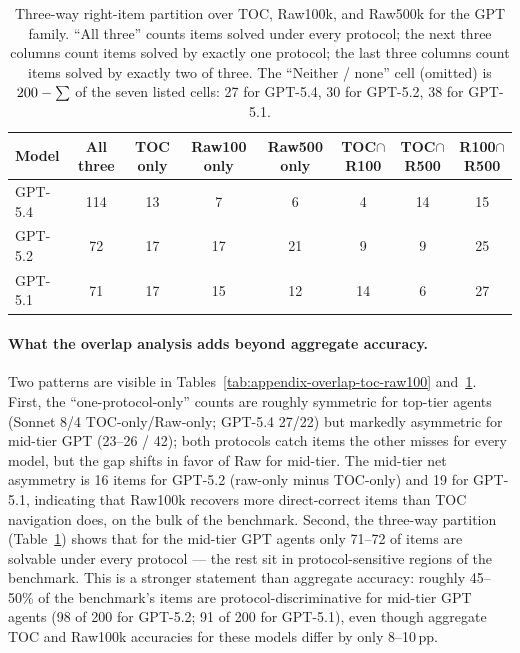 \documentclass{article}
\begin{document}
\begin{table}[h]
\centering
\small
\setlength{\tabcolsep}{6pt}
\caption{Three-way right-item partition over TOC, Raw100k, and Raw500k for the GPT family. ``All three'' counts items solved under every protocol; the next three columns count items solved by exactly one protocol; the last three columns count items solved by exactly two of three. The ``Neither / none'' cell (omitted) is $200-\sum$ of the seven listed cells: 27 for GPT-5.4, 30 for GPT-5.2, 38 for GPT-5.1.}
\label{tab:appendix-overlap-three-way}
\begin{tabular}{lccccccc}
\toprule
Model & All three & TOC only & Raw100 only & Raw500 only & TOC$\cap$R100 & TOC$\cap$R500 & R100$\cap$R500 \\
\midrule
GPT-5.4 & 114 & 13 & 7 & 6 & 4 & 14 & 15 \\
GPT-5.2 & 72 & 17 & 17 & 21 & 9 & 9 & 25 \\
GPT-5.1 & 71 & 17 & 15 & 12 & 14 & 6 & 27 \\
\bottomrule
\end{tabular}
\end{table}

\paragraph{What the overlap analysis adds beyond aggregate accuracy.}
Two patterns are visible in Tables~\ref{tab:appendix-overlap-toc-raw100} and~\ref{tab:appendix-overlap-three-way}. First, the ``one-protocol-only'' counts are roughly symmetric for top-tier agents (Sonnet 8/4 TOC-only/Raw-only; GPT-5.4 27/22) but markedly asymmetric for mid-tier GPT (23--26 / 42); both protocols catch items the other misses for every model, but the gap shifts in favor of Raw for mid-tier. The mid-tier net asymmetry is 16 items for GPT-5.2 (raw-only minus TOC-only) and 19 for GPT-5.1, indicating that Raw100k recovers more direct-correct items than TOC navigation does, on the bulk of the benchmark. Second, the three-way partition (Table~\ref{tab:appendix-overlap-three-way}) shows that for the mid-tier GPT agents only 71--72 of \BenchN{} items are solvable under every protocol — the rest sit in protocol-sensitive regions of the benchmark. This is a stronger statement than aggregate accuracy: roughly 45--50\% of the benchmark's items are protocol-discriminative for mid-tier GPT agents (98 of 200 for GPT-5.2; 91 of 200 for GPT-5.1), even though aggregate TOC and Raw100k accuracies for these models differ by only 8--10\,pp.
\end{document}

